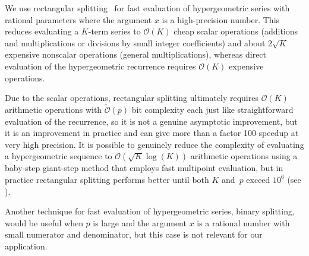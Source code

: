 \documentclass{siamart0216}
\newcommand{\OO}{\mathcal{O}}
\newcommand{\OOtilde}{\widetilde{\mathcal{O}}}
\begin{document}
\label{sec:serieseval}

We use rectangular splitting~\cite{Smith1989,Johansson2014rectangular}
for fast evaluation of hypergeometric series with
rational parameters where the argument $x$ is a high-precision number.
This reduces evaluating a $K$-term series to
$\OO(K)$ cheap scalar operations (additions and multiplications or divisions
by small integer coefficients)
and about $2\sqrt{K}$ expensive nonscalar operations (general multiplications),
whereas direct evaluation of the hypergeometric
recurrence requires $\OO(K)$ expensive operations.

Due to the scalar operations, rectangular splitting ultimately
requires $\OO(K)$ arithmetic operations with $\OOtilde(p)$ bit complexity
each
just like straightforward evaluation of the recurrence, so it is
not a genuine asymptotic improvement, but
it is an improvement in practice and
can give more than a factor 100 speedup at very high precision.
It is possible to genuinely reduce the complexity of evaluating
a hypergeometric sequence to $\OO(\sqrt{K} \log(K))$ arithmetic
operations using a baby-step giant-step method
that employs fast multipoint evaluation,
but in practice rectangular splitting
performs better until both $K$ and~$p$
exceed $10^6$ (see \cite{Johansson2014rectangular}).

Another technique for fast evaluation of hypergeometric series,
binary splitting, would be useful when $p$ is large and the
argument $x$ is a rational number with small numerator and denominator,
but this case is not relevant for our application.
\end{document}
